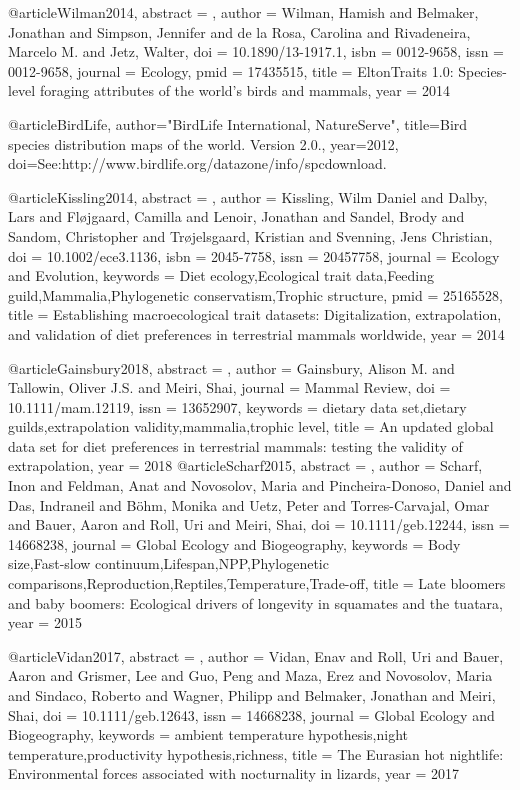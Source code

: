 {{{{{{@article{Wilman2014,
abstract = {},
author = {Wilman, Hamish and Belmaker, Jonathan and Simpson, Jennifer and de la Rosa, Carolina and Rivadeneira, Marcelo M. and Jetz, Walter},
doi = {10.1890/13-1917.1},
isbn = {0012-9658},
issn = {0012-9658},
journal = {Ecology},
pmid = {17435515},
title = {{EltonTraits 1.0: Species-level foraging attributes of the world's birds and mammals}},
year = {2014}
}


@article{BirdLife, 
author="BirdLife International, NatureServe",
title={{Bird species distribution maps of the world. Version 2.0.}},
year={2012}, 
doi={See:http://www.birdlife.org/datazone/info/spcdownload.}
}

@article{Kissling2014,
abstract = {},
author = {Kissling, Wilm Daniel and Dalby, Lars and Fl{\o}jgaard, Camilla and Lenoir, Jonathan and Sandel, Brody and Sandom, Christopher and Tr{\o}jelsgaard, Kristian and Svenning, Jens Christian},
doi = {10.1002/ece3.1136},
isbn = {2045-7758},
issn = {20457758},
journal = {Ecology and Evolution},
keywords = {Diet ecology,Ecological trait data,Feeding guild,Mammalia,Phylogenetic conservatism,Trophic structure},
pmid = {25165528},
title = {{Establishing macroecological trait datasets: Digitalization, extrapolation, and validation of diet preferences in terrestrial mammals worldwide}},
year = {2014}
}

@article{Gainsbury2018,
abstract = {},
author = {Gainsbury, Alison M. and Tallowin, Oliver J.S. and Meiri, Shai},
journal = {Mammal Review},
doi = {10.1111/mam.12119},
issn = {13652907},
keywords = {dietary data set,dietary guilds,extrapolation validity,mammalia,trophic level},
title = {{An updated global data set for diet preferences in terrestrial mammals: testing the validity of extrapolation}},
year = {2018}
}
@article{Scharf2015,
abstract = {},
author = {Scharf, Inon and Feldman, Anat and Novosolov, Maria and Pincheira-Donoso, Daniel and Das, Indraneil and B{\"{o}}hm, Monika and Uetz, Peter and Torres-Carvajal, Omar and Bauer, Aaron and Roll, Uri and Meiri, Shai},
doi = {10.1111/geb.12244},
issn = {14668238},
journal = {Global Ecology and Biogeography},
keywords = {Body size,Fast-slow continuum,Lifespan,NPP,Phylogenetic comparisons,Reproduction,Reptiles,Temperature,Trade-off},
title = {{Late bloomers and baby boomers: Ecological drivers of longevity in squamates and the tuatara}},
year = {2015}
}

@article{Vidan2017,
abstract = {},
author = {Vidan, Enav and Roll, Uri and Bauer, Aaron and Grismer, Lee and Guo, Peng and Maza, Erez and Novosolov, Maria and Sindaco, Roberto and Wagner, Philipp and Belmaker, Jonathan and Meiri, Shai},
doi = {10.1111/geb.12643},
issn = {14668238},
journal = {Global Ecology and Biogeography},
keywords = {ambient temperature hypothesis,night temperature,productivity hypothesis,richness},
title = {{The Eurasian hot nightlife: Environmental forces associated with nocturnality in lizards}},
year = {2017}
}

}}}}}}
